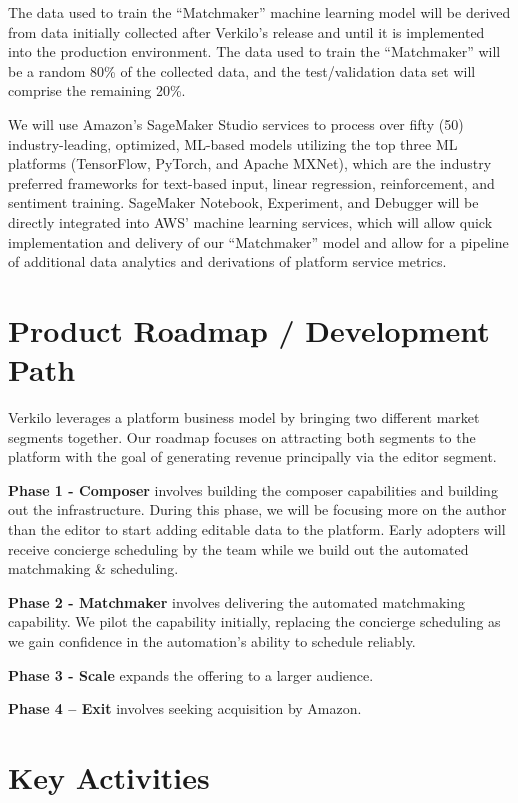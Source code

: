 \documentclass[10pt,openany]{book}
\begin{document}
The data used to train the ``Matchmaker'' machine learning model will be
derived from data initially collected after Verkilo's release and until
it is implemented into the production environment. The data used to
train the ``Matchmaker'' will be a random 80\% of the collected data,
and the test/validation data set will comprise the remaining 20\%.

We will use Amazon's SageMaker Studio services to process over fifty
(50) industry-leading, optimized, ML-based models utilizing the top
three ML platforms (TensorFlow, PyTorch, and Apache MXNet), which are
the industry preferred frameworks for text-based input, linear
regression, reinforcement, and sentiment training. SageMaker Notebook,
Experiment, and Debugger will be directly integrated into AWS' machine
learning services, which will allow quick implementation and delivery of
our ``Matchmaker'' model and allow for a pipeline of additional data
analytics and derivations of platform service metrics.

\hypertarget{product-roadmap-development-path}{%
\section{Product Roadmap / Development
Path}\label{product-roadmap-development-path}}

Verkilo leverages a platform business model by bringing two different
market segments together. Our roadmap focuses on attracting both
segments to the platform with the goal of generating revenue principally
via the editor segment.

\textbf{Phase 1 - Composer} involves building the composer capabilities
and building out the infrastructure. During this phase, we will be
focusing more on the author than the editor to start adding editable
data to the platform. Early adopters will receive concierge scheduling
by the team while we build out the automated matchmaking \& scheduling.

\textbf{Phase 2 - Matchmaker} involves delivering the automated
matchmaking capability. We pilot the capability initially, replacing the
concierge scheduling as we gain confidence in the automation's ability
to schedule reliably.

\textbf{Phase 3 - Scale} expands the offering to a larger audience.

\textbf{Phase 4 -- Exit} involves seeking acquisition by Amazon.

\hypertarget{key-activities}{%
\section{Key Activities}\label{key-activities}}
\end{document}
